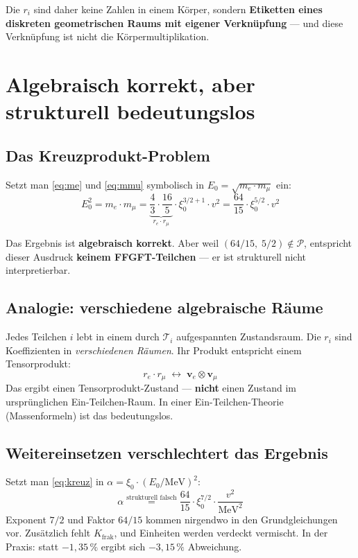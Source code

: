 Die $r_i$ sind daher keine Zahlen in einem Körper, sondern
\textbf{Etiketten eines diskreten geometrischen Raums mit eigener
Verknüpfung} --- und diese Verknüpfung ist nicht die Körpermultiplikation.

\section{Algebraisch korrekt, aber strukturell bedeutungslos}

\subsection{Das Kreuzprodukt-Problem}

Setzt man \eqref{eq:me} und \eqref{eq:mmu} symbolisch in
$E_0 = \sqrt{m_e \cdot m_\mu}$ ein:
\begin{equation}
  E_0^2 = m_e \cdot m_\mu
        = \underbrace{\frac{4}{3} \cdot \frac{16}{5}}_{r_e \cdot r_\mu}
          \cdot \xi_0^{3/2 + 1} \cdot v^2
        = \frac{64}{15} \cdot \xi_0^{5/2} \cdot v^2
  \label{eq:kreuz}
\end{equation}

Das Ergebnis ist \textbf{algebraisch korrekt}. Aber weil
$(64/15,\;5/2) \notin \mathcal{P}$, entspricht dieser Ausdruck
\textbf{keinem FFGFT-Teilchen} --- er ist strukturell nicht
interpretierbar.

\subsection{Analogie: verschiedene algebraische Räume}

Jedes Teilchen $i$ lebt in einem durch $\mathcal{T}_i$ aufgespannten
Zustandsraum. Die $r_i$ sind Koeffizienten in \emph{verschiedenen Räumen}.
Ihr Produkt entspricht einem Tensorprodukt:
\[
  r_e \cdot r_\mu \;\leftrightarrow\; \mathbf{v}_e \otimes \mathbf{v}_\mu
\]
Das ergibt einen Tensorprodukt-Zustand --- \textbf{nicht} einen Zustand
im ursprünglichen Ein-Teilchen-Raum. In einer Ein-Teilchen-Theorie
(Massenformeln) ist das bedeutungslos.

\subsection{Weitereinsetzen verschlechtert das Ergebnis}

Setzt man \eqref{eq:kreuz} in $\alpha = \xi_0 \cdot (E_0/\text{MeV})^2$:
\begin{equation}
  \alpha \stackrel{\text{strukturell falsch}}{=}
  \frac{64}{15} \cdot \xi_0^{7/2} \cdot \frac{v^2}{\text{MeV}^2}
\end{equation}
Exponent $7/2$ und Faktor $64/15$ kommen nirgendwo in den
Grundgleichungen vor. Zusätzlich fehlt $K_{\text{frak}}$,
und Einheiten werden verdeckt vermischt.
In der Praxis: statt $-1{,}35\,\%$ ergibt sich $-3{,}15\,\%$
Abweichung.

